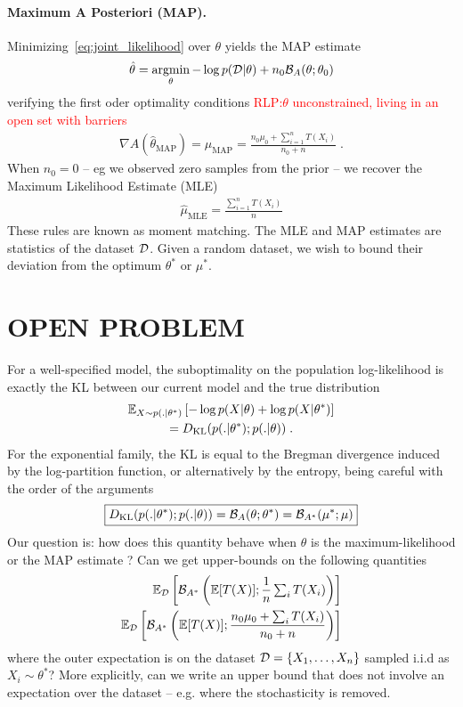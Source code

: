 \documentclass[twoside]{article}
\let\oldsection\section
\renewcommand{\section}[1]{\oldsection{\uppercase{#1}}}
\newcommand{\RLP}[1]{\textcolor{red}{RLP:#1}}
\newcommand*{\expect}[2][]{\ensuremath{\mathbb{E}_{#1} \left[ #2 \right] }} %
\newcommand{\logpart}{A}
\newcommand{\bregman}{\cB_\logpart}
\newcommand{\bregmanconj}{\cB_{\logpart^*}}
\newcommand{\natp}{\theta}
\newcommand{\meanp}{\mu}
\begin{document}
\paragraph{Maximum A Posteriori (MAP).}
Minimizing~\eqref{eq:joint_likelihood} over $\natp$ yields the MAP estimate
\begin{align}
    \hat \natp = \argmin_\natp -\log p(\cD|\natp) + n_0 \bregman(\natp ; \natp_0)
\end{align}
verifying the first oder optimality conditions \RLP{$\natp$ unconstrained, living in an open set with barriers}
\begin{align}
    \nabla \logpart(\hat \natp_\text{MAP}) = \hat \meanp_\text{MAP}
    = \frac{n_0 \meanp_0 + \sum_{i=1}^n T(X_i) }{n_0+n} \; .
\end{align}
When $n_0=0$ -- eg we observed zero samples from the prior -- we recover the Maximum Likelihood Estimate (MLE)
\begin{align}
	\hat \mu_\text{MLE} = \frac{\sum_{i=1}^n T(X_i)}{n}
\end{align}
These rules are known as moment matching.
The MLE and MAP estimates are statistics of the dataset ${\mathcal D}$. Given a random dataset, we wish to bound their deviation from the optimum $\natp^*$ or $\meanp^*$.


\section{Open Problem}

For a well-specified model, the suboptimality on the population log-likelihood is exactly the KL between our current model and the true distribution
\begin{multline}
    \expect[X\sim p(.|\natp^*)]{-\log p(X|\natp) + \log p(X|\natp^*) } \\
	= \KL( p(.|\natp^*) ; p(.|\natp)) \; .
\end{multline}
For the exponential family, the KL is equal to the Bregman divergence induced by the log-partition function, or alternatively by the entropy, being careful with the order of the arguments 
\begin{align}
\boxed{
	\KL( p(.|\natp^*) ; p(.|\natp))
    = \bregman (\natp ; \natp^*)
    = \bregmanconj ( \meanp^* ; \meanp)
}
\end{align}
Our question is: how does this quantity behave when $\natp$ is the maximum-likelihood or the MAP estimate ? Can we get upper-bounds on the following quantities
\begin{align}
	\label{eq:bregmanMLE}
	\expect[\cD]{\bregmanconj \left (\E [T(X)] ;  \inv{n}  \smallsum_i T(X_i) \right )} \\
	\label{eq:bregmanMAP}
	\expect[\cD]{\bregmanconj \left (\E [T(X)] ; \frac{n_0 \mu_0 + \smallsum_i T(X_i)}{n_0+n} \right )} 
\end{align}
where the outer expectation is on the dataset ${\mathcal D} = \{X_1, \dots, X_n \}$ sampled i.i.d as $X_i\sim \natp^*$?
More explicitly, can we write an upper bound that does not involve an expectation over the dataset -- e.g. where the stochasticity is removed.
\end{document}
